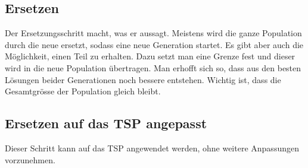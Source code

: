 %
%
%
%
\subsection{Ersetzen
\label{varalgbuch:paper:varalg:subsection:replacement}}
Der Ersetzungsschritt macht, was er aussagt. Meistens wird die ganze 
Population durch die neue ersetzt, sodass eine neue Generation startet.
Es gibt aber auch die Möglichkeit, einen Teil zu erhalten. Dazu setzt man eine 
Grenze fest und dieser wird in die neue Population übertragen. Man erhofft sich so, 
dass aus den besten Lösungen beider Generationen noch bessere entstehen.
Wichtig ist, dass die Gesamtgrösse der Population gleich bleibt.

\subsection{Ersetzen auf das TSP angepasst
\label{buch:paper:varalg:subsection:replacement_tsp}}
Dieser Schritt kann auf das TSP angewendet werden, ohne weitere
Anpassungen vorzunehmen.
